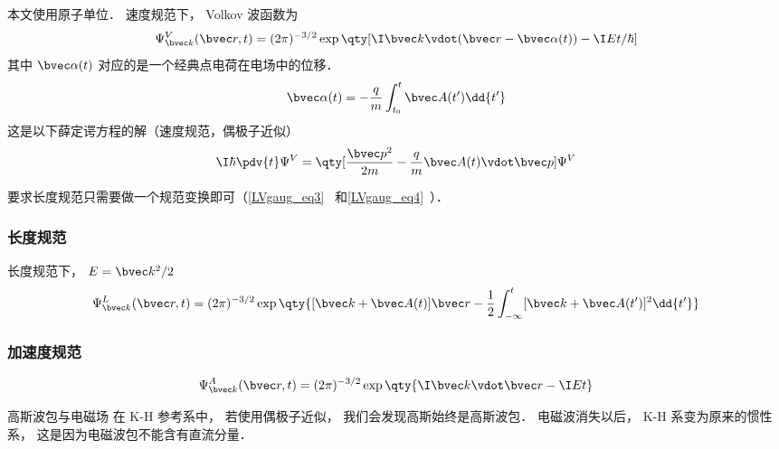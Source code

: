 

本文使用原子单位． 速度规范下， Volkov 波函数为
\begin{equation}
\Psi_{\bvec k}^V(\bvec r, t) = (2\pi)^{-3/2} \exp\qty[\I \bvec k \vdot (\bvec r - \bvec \alpha(t)) - \I Et/\hbar]
\end{equation}
其中 $\bvec \alpha(t)$ 对应的是一个经典点电荷在电场中的位移．
\begin{equation}
\bvec \alpha(t) = -\frac{q}{m} \int_{t_0}^t \bvec A(t') \dd{t'}
\end{equation}
这是以下薛定谔方程的解（速度规范，偶极子近似）
\begin{equation}
\I\hbar \pdv{t} \Psi^V = \qty[\frac{\bvec p^2}{2m} - \frac{q}{m}\bvec A(t) \vdot \bvec p] \Psi^V
\end{equation}

要求长度规范只需要做一个规范变换即可（\autoref{LVgaug_eq3}~ 和\autoref{LVgaug_eq4}~）．

\subsubsection{长度规范}
长度规范下，  $E = \bvec k^2/2$
\begin{equation}
\Psi_{\bvec k}^L(\bvec r, t) = (2\pi)^{-3/2} \exp\qty{[\bvec k + \bvec A(t)]\bvec r - \frac{1}{2}\int_{-\infty}^t [\bvec k + \bvec A(t')]^2 \dd{t'}}
\end{equation}

\subsubsection{加速度规范}
\begin{equation}
\Psi_{\bvec k}^A(\bvec r, t) = (2\pi)^{-3/2} \exp\qty{\I\bvec k \vdot \bvec r - \I Et}
\end{equation}

\begin{example}{高斯波包与电磁场}
在 K-H 参考系中， 若使用偶极子近似， 我们会发现高斯始终是高斯波包． 电磁波消失以后， K-H 系变为原来的惯性系， 这是因为电磁波包不能含有直流分量．
\end{example}
